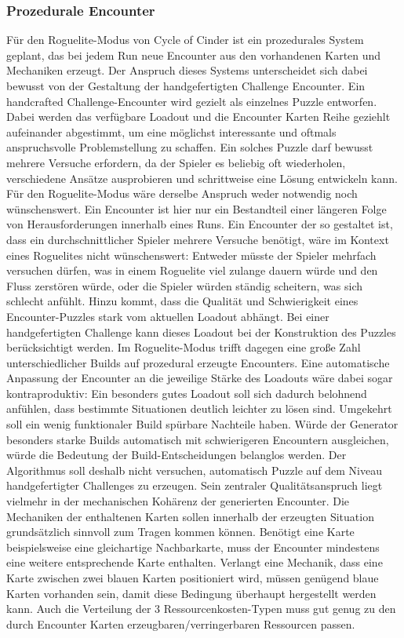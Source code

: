 \subsubsection{Prozedurale Encounter}
Für den Roguelite-Modus von Cycle of Cinder ist ein prozedurales System geplant, das bei jedem Run neue Encounter aus den vorhandenen Karten und Mechaniken erzeugt. Der Anspruch dieses Systems unterscheidet sich dabei bewusst von der Gestaltung der handgefertigten Challenge Encounter.
Ein handcrafted Challenge-Encounter wird gezielt als einzelnes Puzzle entworfen. Dabei werden das verfügbare Loadout und die Encounter Karten Reihe geziehlt aufeinander abgestimmt, um eine möglichst interessante und oftmals anspruchsvolle Problemstellung zu schaffen. Ein solches Puzzle darf bewusst mehrere Versuche erfordern, da der Spieler es beliebig oft wiederholen, verschiedene Ansätze ausprobieren und schrittweise eine Lösung entwickeln kann.
Für den Roguelite-Modus wäre derselbe Anspruch weder notwendig noch wünschenswert. Ein Encounter ist hier nur ein Bestandteil einer längeren Folge von Herausforderungen innerhalb eines Runs. Ein Encounter der so gestaltet ist, dass ein durchschnittlicher Spieler mehrere Versuche benötigt, wäre im Kontext eines Roguelites nicht wünschenswert: Entweder müsste der Spieler mehrfach versuchen dürfen, was in einem Roguelite viel zulange dauern würde und den Fluss zerstören würde, oder die Spieler würden ständig scheitern, was sich schlecht anfühlt.
Hinzu kommt, dass die Qualität und Schwierigkeit eines Encounter-Puzzles stark vom aktuellen Loadout abhängt. Bei einer handgefertigten Challenge kann dieses Loadout bei der Konstruktion des Puzzles berücksichtigt werden. Im Roguelite-Modus trifft dagegen eine große Zahl unterschiedlicher Builds auf prozedural erzeugte Encounters. Eine automatische Anpassung der Encounter an die jeweilige Stärke des Loadouts wäre dabei sogar kontraproduktiv: Ein besonders gutes Loadout soll sich dadurch belohnend anfühlen, dass bestimmte Situationen deutlich leichter zu lösen sind. Umgekehrt soll ein wenig funktionaler Build spürbare Nachteile haben. Würde der Generator besonders starke Builds automatisch mit schwierigeren Encountern ausgleichen, würde die Bedeutung der Build-Entscheidungen belanglos werden.
Der Algorithmus soll deshalb nicht versuchen, automatisch Puzzle auf dem Niveau handgefertigter Challenges zu erzeugen. Sein zentraler Qualitätsanspruch liegt vielmehr in der mechanischen Kohärenz der generierten Encounter. Die Mechaniken der enthaltenen Karten sollen innerhalb der erzeugten Situation grundsätzlich sinnvoll zum Tragen kommen können. Benötigt eine Karte beispielsweise eine gleichartige Nachbarkarte, muss der Encounter mindestens eine weitere entsprechende Karte enthalten. Verlangt eine Mechanik, dass eine Karte zwischen zwei blauen Karten positioniert wird, müssen genügend blaue Karten vorhanden sein, damit diese Bedingung überhaupt hergestellt werden kann. Auch die Verteilung der 3 Ressourcenkosten-Typen muss gut genug zu den durch Encounter Karten erzeugbaren/verringerbaren Ressourcen passen.
